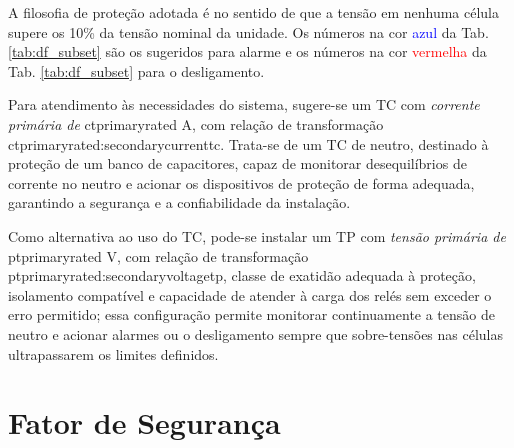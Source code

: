 \documentclass[a4paper]{article}
\begin{document}

A filosofia de proteção adotada é no sentido de que a tensão em nenhuma célula supere os 10\% da tensão nominal da unidade. Os números na cor \textcolor{blue}{azul} da Tab. \ref{tab:df_subset} são os sugeridos para alarme e os números na cor \textcolor{red}{vermelha} da Tab. \ref{tab:df_subset} para o desligamento.

Para atendimento às necessidades do sistema, sugere-se um TC com {\it corrente primária de} {{ctprimaryrated}} A, com relação de transformação {{ctprimaryrated}}:{{secondarycurrenttc}}. Trata-se de um TC de neutro, destinado à proteção de um banco de capacitores, capaz de monitorar desequilíbrios de corrente no neutro e acionar os dispositivos de proteção de forma adequada, garantindo a segurança e a confiabilidade da instalação.

Como alternativa ao uso do TC, pode-se instalar um TP com {\it tensão primária de} {{ptprimaryrated}} V, com relação de transformação {{ptprimaryrated}}:{{secondaryvoltagetp}}, classe de exatidão adequada à proteção, isolamento compatível e capacidade de atender à carga dos relés sem exceder o erro permitido; essa configuração permite monitorar continuamente a tensão de neutro e acionar alarmes ou o desligamento sempre que sobre-tensões nas células ultrapassarem os limites definidos.

\section{Fator de Segurança}
\end{document}
